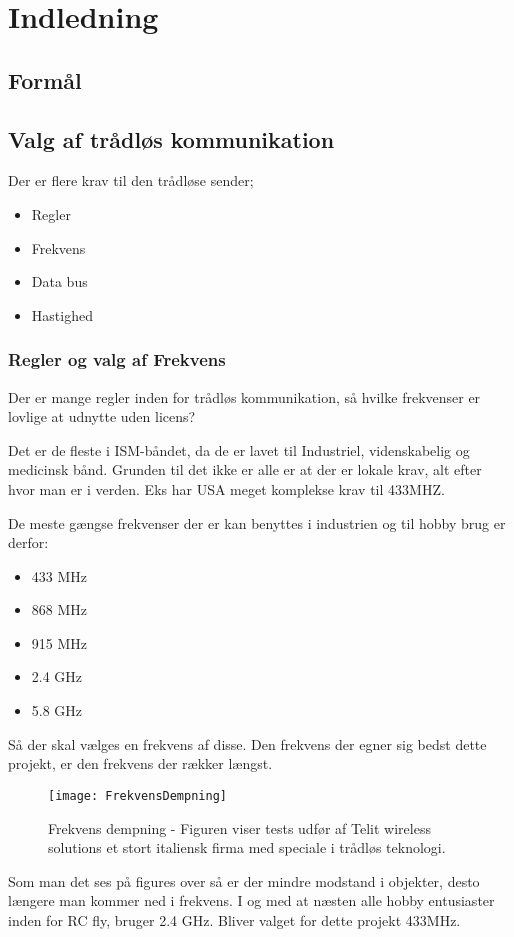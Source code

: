 \documentclass[Main]{subfiles}
\begin{document}
\chapter{Indledning}

\section{Formål}

\section{Valg af trådløs kommunikation}

Der er flere krav til den trådløse sender;

\begin{itemize}
\item Regler
\item Frekvens
\item Data bus
\item Hastighed
\end{itemize}

\subsection{Regler og valg af Frekvens}
Der er mange regler inden for trådløs kommunikation, så hvilke frekvenser er lovlige at udnytte uden licens?

Det er de fleste i ISM-båndet, da de er lavet til  Industriel, videnskabelig og medicinsk bånd. Grunden til det ikke er alle er at der er lokale krav, alt efter hvor man er i verden. Eks har USA meget komplekse krav til 433MHZ.\cite[s. 32]{Lov1}

De meste gængse frekvenser der er kan benyttes i industrien og til hobby brug er derfor:

\begin{itemize}
\item 433 MHz
\item 868 MHz
\item 915 MHz
\item 2.4 GHz
\item 5.8 GHz
\end{itemize}

Så der skal vælges en frekvens af disse.
Den frekvens der egner sig bedst dette projekt, er den frekvens der rækker længst. 

\begin{figure}[H]
\centering
\texttt{[image: FrekvensDempning]}
\caption{Frekvens dempning - Figuren viser tests udfør af Telit wireless solutions et stort italiensk firma med speciale i trådløs teknologi.}
\end{figure}




Som man det ses på figures over så er der mindre modstand i objekter, desto længere man kommer ned i frekvens.
I og med at næsten alle hobby entusiaster inden for RC fly, bruger 2.4 GHz. 
Bliver valget for dette projekt 433MHz.
\end{document}
